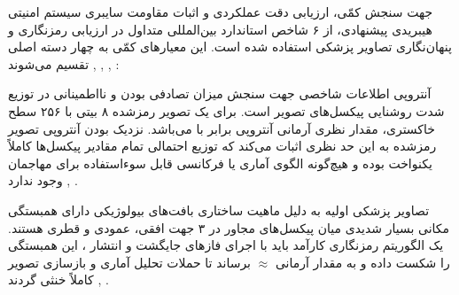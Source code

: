 




جهت سنجش کمّی، ارزیابی دقت عملکردی و اثبات مقاومت سایبری سیستم امنیتی هیبریدی پیشنهادی، از ۶ شاخص استاندارد بین‌المللی متداول در ارزیابی رمزنگاری و پنهان‌نگاری تصاویر پزشکی استفاده شده است. این معیارهای کمّی به چهار دسته اصلی تقسیم می‌شوند , , , :\par




آنتروپی اطلاعات شاخصی جهت سنجش میزان تصادفی بودن و نااطمینانی در توزیع شدت روشنایی پیکسل‌های تصویر است. برای یک تصویر رمزشده ۸ بیتی با ۲۵۶ سطح خاکستری، مقدار نظری آرمانی آنتروپی برابر با  می‌باشد. نزدیک بودن آنتروپی تصویر رمزشده به این حد نظری اثبات می‌کند که توزیع احتمالی تمام مقادیر پیکسل‌ها کاملاً یکنواخت بوده و هیچ‌گونه الگوی آماری یا فرکانسی قابل سوءاستفاده برای مهاجمان وجود ندارد , .\par




تصاویر پزشکی اولیه به دلیل ماهیت ساختاری بافت‌های بیولوژیکی دارای همبستگی مکانی بسیار شدیدی  میان پیکسل‌های مجاور در ۳ جهت افقی، عمودی و قطری هستند. یک الگوریتم رمزنگاری کارآمد باید با اجرای فازهای جایگشت  و انتشار ، این همبستگی را شکست داده و به مقدار آرمانی  \ensuremath{\approx}  برساند تا حملات تحلیل آماری و بازسازی تصویر کاملاً خنثی گردند , .\par

